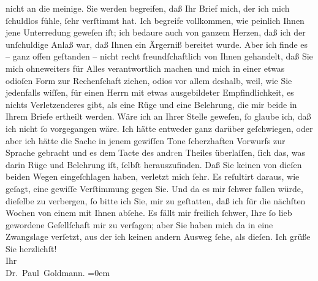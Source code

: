 \begin{ledgroupsized}[t]{13cm}
               nicht an die meinige.\pend
           \pstart
           Sie werden begreifen, daß Ihr Brief mich, der ich mich ſchuldlos fühle, ſehr
               verſtimmt hat. Ich begreife vollkommen, wie peinlich Ihnen jene Unterredung geweſen
               iſt; ich bedaure auch von ganzem Herzen, daß ich der unſchuldige Anlaß war, daß Ihnen
               ein Ärgerniß bereitet wurde. Aber ich finde es – ganz offen geſtanden – {\pb}nicht recht ſreundſchaftlich von Ihnen gehandelt,
               daß Sie mich ohneweiters für Alles verantwortlich machen und mich in einer etwas
               odioſen Form zur Rechenſchaft ziehen, odios vor allem deshalb, weil, wie Sie
               jedenfalls wiſſen, \strikeout{\textcolor{gray}{e}}für einen Herrn mit etwas ausgebildeter Empfindlichkeit, es nichts
               Verletzenderes gibt, als eine Rüge und eine Belehrung, die mir beide in Ihrem Briefe
               ertheilt werden. Wäre ich an Ihrer Stelle geweſen, ſo glaube ich, daß ich nicht ſo
               vorgegangen wäre. Ich hätte entweder ganz darüber geſchwiegen, oder aber ich hätte
               die Sache in jenem gewiſſen Tone ſcherzhaften Vorwurfs zur Sprache gebracht und es
               dem Tacte des and\textcolor{gray}{re}n Theiles überlaſſen, ſich das, was darin Rüge
               und Belehrung iſt, ſelbſt herauszufinden.\pend
           \pstart
           Daß Sie  keinen von dieſen beiden Wegen
               eingeſchlagen haben, verletzt mich ſehr. Es reſultirt daraus, wie geſagt, eine
               gewiſſe Verſtimmung gegen Sie. Und da es mir ſchwer fallen würde, dieſelbe zu
               verbergen, ſo bitte ich Sie, \strikeout{\textcolor{gray}{d}} mir zu geſtatten, daß ich für die nächſten Wochen von einem {\pb}\label{K_L02646-1v}\label{K_L02646-1h}
               mit Ihnen abſehe. Es fällt mir freilich ſchwer, Ihre ſo lieb gewordene Geſellſchaft
               mir zu verſagen; aber Sie haben mich da in eine Zwangslage verſetzt, aus der ich
               keinen andern Ausweg ſehe, als dieſen.\pend
           \pstart
           Ich grüße Sie herzlichſt! {\\[\baselineskip]}Ihr {\\[\baselineskip]}\spacefill\mbox{Dr. Paul Goldmann.}\pend
           \leftskip=0em{}
         
         \endnumbering{}\end{ledgroupsized}  \newcommand{\dateiname}{L02646}\newcommand{\titel}{Paul Goldmann an Arthur Schnitzler, 6. 12. 1889}\newcommand{\editorInnen}{Martin Anton Müller und Laura Untner}
      